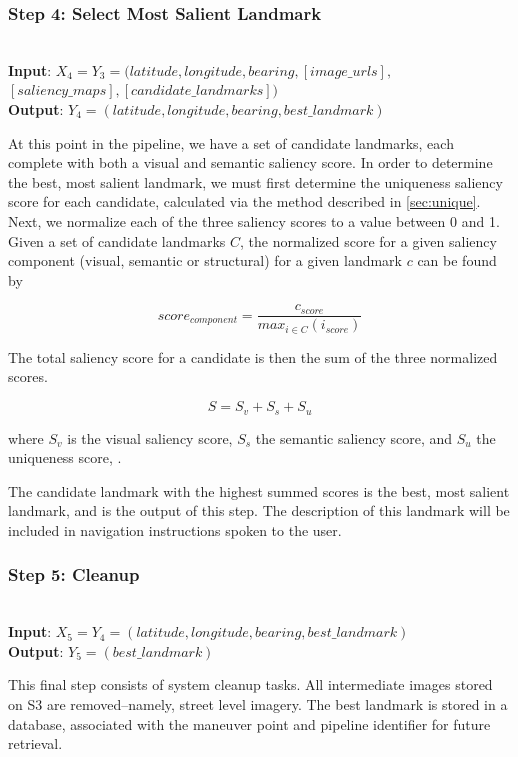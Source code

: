 \subsubsection*{Step 4: Select Most Salient Landmark}~\\
\noindent\textbf{Input}: $X_4 = Y_3 = (latitude, longitude, bearing,  [image\_urls],$\\ $[saliency\_maps], [candidate\_landmarks] )$\\
\textbf{Output}: $Y_4 = (latitude, longitude, bearing, best\_landmark)$ 

At this point in the pipeline, we have a set of candidate landmarks, each complete with both a visual and semantic saliency score. In order to determine the best, most salient landmark, we must first determine the uniqueness saliency score for each candidate, calculated via the method described in \ref{sec:unique}. Next, we normalize each of the three saliency scores to a value between 0 and 1. Given a set of candidate landmarks $C$, the normalized score for a given saliency component (visual, semantic or structural) for a given landmark $c$ can be found by

\begin{equation}
    score_{component} = \frac{c_{score}}{max_{i \in C}(i_{score})}
\end{equation}

The total saliency score for a candidate is then the sum of the three normalized scores. 

\begin{equation}\label{eq:saliency}
    S = S_v + S_s + S_u
\end{equation}

where $S_v$ is the visual saliency score, $S_s$ the semantic saliency score, and $S_u$ the uniqueness score, .

The candidate landmark with the highest summed scores is the best, most salient landmark, and is the output of this step. The description of this landmark will be included in navigation instructions spoken to the user.

\subsubsection*{Step 5: Cleanup}~\\
\noindent\textbf{Input}: $X_5 = Y_4 = (latitude, longitude, bearing, best\_landmark)$\\
\textbf{Output}: $Y_5 = (best\_landmark)$

This final step consists of system cleanup tasks. All intermediate images stored on S3 are removed--namely, street level imagery. The best landmark is stored in a database, associated with the maneuver point and pipeline identifier for future retrieval.

